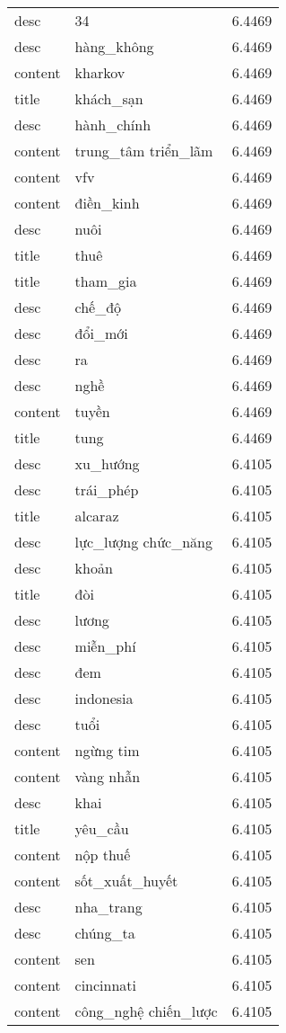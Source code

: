 \documentclass{article}
\begin{document}
\begin{tabular}{lll}
desc & 34 & 6.4469\\
desc & hàng\_không & 6.4469\\
content & kharkov & 6.4469\\
title & khách\_sạn & 6.4469\\
desc & hành\_chính & 6.4469\\
content & trung\_tâm triển\_lãm & 6.4469\\
content & vfv & 6.4469\\
content & điền\_kinh & 6.4469\\
desc & nuôi & 6.4469\\
title & thuê & 6.4469\\
title & tham\_gia & 6.4469\\
desc & chế\_độ & 6.4469\\
desc & đổi\_mới & 6.4469\\
desc & ra & 6.4469\\
desc & nghề & 6.4469\\
content & tuyền & 6.4469\\
title & tung & 6.4469\\
desc & xu\_hướng & 6.4105\\
desc & trái\_phép & 6.4105\\
title & alcaraz & 6.4105\\
desc & lực\_lượng chức\_năng & 6.4105\\
desc & khoản & 6.4105\\
title & đòi & 6.4105\\
desc & lương & 6.4105\\
desc & miễn\_phí & 6.4105\\
desc & đem & 6.4105\\
desc & indonesia & 6.4105\\
desc & tuổi & 6.4105\\
content & ngừng tim & 6.4105\\
content & vàng nhẫn & 6.4105\\
desc & khai & 6.4105\\
title & yêu\_cầu & 6.4105\\
content & nộp thuế & 6.4105\\
content & sốt\_xuất\_huyết & 6.4105\\
desc & nha\_trang & 6.4105\\
desc & chúng\_ta & 6.4105\\
content & sen & 6.4105\\
content & cincinnati & 6.4105\\
content & công\_nghệ chiến\_lược & 6.4105\\

\end{tabular}
\end{document}
